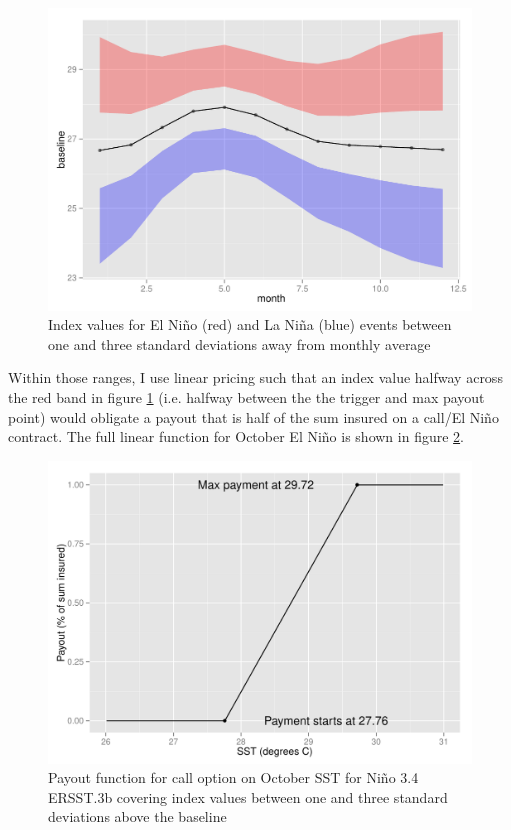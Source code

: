\documentclass[authoryear]{article}
\begin{document}
\begin{figure}[!htbp]
  \includegraphics[width=\linewidth]{Pricingfigs/optionParamsByMonth}
  \caption{Index values for El Ni\~no (red) and La Ni\~na (blue) events between one and three standard deviations away from monthly average}
   \label{fig:optionParamsByMonth}
\end{figure}

Within those ranges, I use linear pricing such that an index value halfway across the red band in figure \ref{fig:optionParamsByMonth} (i.e. halfway between the the trigger and max payout point) would obligate a payout that is half of the sum insured on a call/El Ni\~no contract. The full linear function for October El Ni\~no is shown in figure \ref{fig:payouyt10callex}. 

\begin{figure}[!htbp]
  \includegraphics[width=\linewidth]{Pricingfigs/payoutExamplemonth10contractType1}
  \caption{Payout function for call option on October SST for Ni\~no 3.4 ERSST.3b covering index values between one and three standard deviations above the baseline}
   \label{fig:payouyt10callex}
\end{figure}
\end{document}
